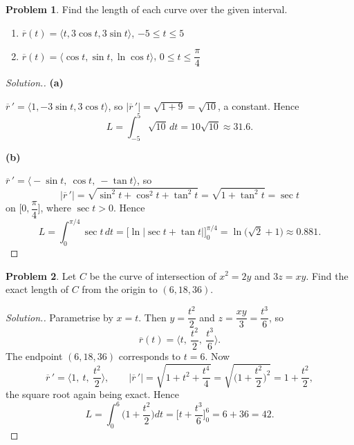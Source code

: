 \documentclass[11pt,a4paper]{article}
\theoremstyle{definition}
\newtheorem{problemx}{Problem}[subsection]
\newenvironment{problem}{\begin{problemx}}{\end{problemx}}
\newenvironment{solution}
  {\renewcommand{\qedsymbol}{}\begin{proof}[\textit{Solution}.]}
  {\end{proof}}
\newcommand{\subhead}[1]{%
  \par\medskip\noindent\textbf{#1}\par\nobreak\smallskip}
\begin{document}
\begin{problem}
Find the length of each curve over the given interval.
\begin{enumerate}
\item[(a)] $\overline{r}(t) = \langle t, 3\cos t, 3\sin t\rangle$,
$-5\leq t\leq 5$
\item[(b)] $\overline{r}(t) = \langle \cos t, \sin t, \ln\cos t\rangle$,
$0\leq t\leq\dfrac{\pi}{4}$
\end{enumerate}
\end{problem}
\begin{solution}
\subhead{(a)}
$\overline{r}\,' = \langle 1, -3\sin t, 3\cos t\rangle$, so
$\left|\overline{r}\,'\right| = \sqrt{1+9} = \sqrt{10}$, a constant. Hence
$$L = \int_{-5}^{5}\sqrt{10}\,dt = 10\sqrt{10}\approx 31.6 .$$

\subhead{(b)}
$\overline{r}\,' = \Big\langle -\sin t,\ \cos t,\ -\tan t\Big\rangle$, so
$$\left|\overline{r}\,'\right| = \sqrt{\sin^2t+\cos^2t+\tan^2t}
= \sqrt{1+\tan^2t} = \sec t$$
on $\Big[0,\dfrac{\pi}{4}\Big]$, where $\sec t>0$. Hence
$$L = \int_0^{\pi/4}\sec t\,dt
= \Big[\ln\left|\sec t+\tan t\right|\Big]_0^{\pi/4}
= \ln\big(\sqrt2+1\big)\approx 0.881 .$$
\end{solution}

\begin{problem}
Let $C$ be the curve of intersection of $x^2 = 2y$ and $3z = xy$. Find the exact
length of $C$ from the origin to $(6,18,36)$.
\end{problem}
\begin{solution}
Parametrise by $x = t$. Then $y = \dfrac{t^2}{2}$ and
$z = \dfrac{xy}{3} = \dfrac{t^3}{6}$, so
$$\overline{r}(t) = \Big\langle t,\ \frac{t^2}{2},\ \frac{t^3}{6}\Big\rangle .$$
The endpoint $(6,18,36)$ corresponds to $t=6$. Now
$$\overline{r}\,' = \Big\langle 1,\ t,\ \frac{t^2}{2}\Big\rangle,\qquad
\left|\overline{r}\,'\right| = \sqrt{1+t^2+\frac{t^4}{4}}
= \sqrt{\Big(1+\frac{t^2}{2}\Big)^2} = 1+\frac{t^2}{2},$$
the square root again being exact. Hence
$$L = \int_0^6\Big(1+\frac{t^2}{2}\Big)dt
= \Big[t + \frac{t^3}{6}\Big]_0^6 = 6 + 36 = 42 .$$
\end{solution}
\end{document}
